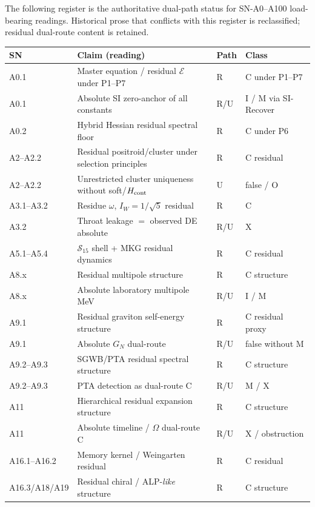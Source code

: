 \begin{theorem}
\label{thm:A348}
The following register is the authoritative dual-path status for SN-A0--A100 load-bearing readings.
Historical prose that conflicts with this register is reclassified; residual dual-route content is retained.
\end{theorem}

\begin{center}
{\small
\begin{tabular}{@{}p{2.4cm}p{5.6cm}p{1.2cm}p{3.0cm}@{}}
\toprule
SN & Claim (reading) & Path & Class \\
\midrule
A0.1 & Master equation / residual $\mathcal{E}$ under P1--P7 & R & C under P1--P7 \\
A0.1 & Absolute SI zero-anchor of all constants & R/U & I / M via SI-Recover \\
A0.2 & Hybrid Hessian residual spectral floor & R & C under P6 \\
A2--A2.2 & Residual positroid/cluster under selection principles & R & C residual \\
A2--A2.2 & Unrestricted cluster uniqueness without soft/$H_{\rm cont}$ & U & false / O \\
A3.1--A3.2 & Residue $\omega$, $I_W=1/\sqrt{5}$ residual & R & C \\
A3.2 & Throat leakage $=$ observed DE absolute & R/U & X \\
A5.1--A5.4 & $\mathcal{S}_{15}$ shell + MKG residual dynamics & R & C residual \\
A8.x & Residual multipole structure & R & C structure \\
A8.x & Absolute laboratory multipole MeV & R/U & I / M \\
A9.1 & Residual graviton self-energy structure & R & C residual proxy \\
A9.1 & Absolute $G_N$ dual-route & R/U & false without M \\
A9.2--A9.3 & SGWB/PTA residual spectral structure & R & C structure \\
A9.2--A9.3 & PTA detection as dual-route C & R/U & M / X \\
A11 & Hierarchical residual expansion structure & R & C structure \\
A11 & Absolute timeline / $\Omega$ dual-route C & R/U & X / obstruction \\
A16.1--A16.2 & Memory kernel / Weingarten residual & R & C residual \\
A16.3/A18/A19 & Residual chiral / ALP-\emph{like} structure & R & C structure \\

\end{tabular}}
\end{center}
